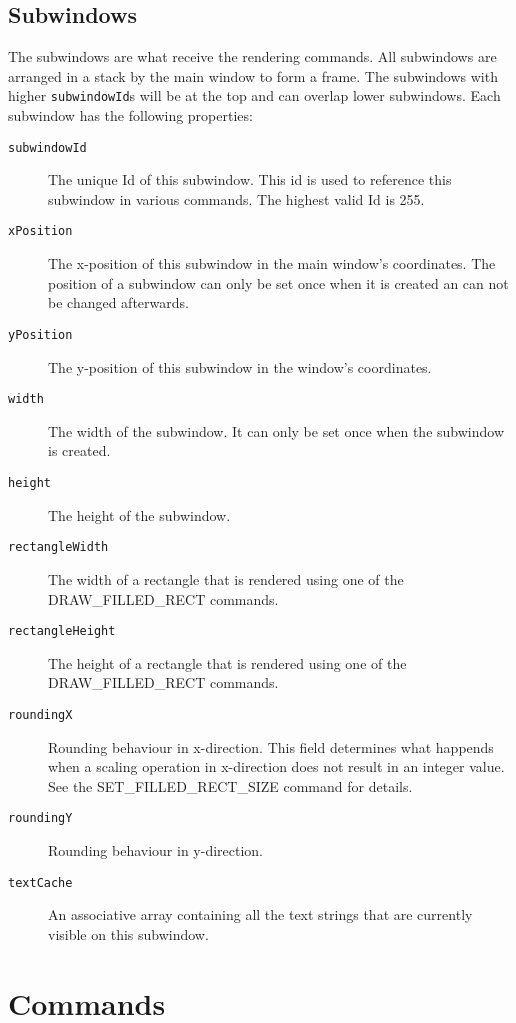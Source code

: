 \documentclass{article}
\newcommand{\field}[1]{\textcolor{fieldColor}{\texttt{#1}}}
\begin{document}
\subsection{Subwindows}
The subwindows are what receive the rendering commands. All subwindows are arranged in a stack by the main window to form a frame. The subwindows with higher \field{subwindowId}s will be at
the top and can overlap lower subwindows.
Each subwindow has the following properties:

\begin{description}
\item [\field{subwindowId}] The unique Id of this subwindow. This id is used to reference this subwindow in various commands. The highest valid Id is 255.
\item [\field{xPosition}] The x-position of this subwindow in the main window's coordinates. The position of a subwindow can only be set once when it is created an can not be changed afterwards.
\item [\field{yPosition}] The y-position of this subwindow in the window's coordinates.
\item [\field{width}] The width of the subwindow. It can only be set once when the subwindow is created.
\item [\field{height}] The height of the subwindow.
\item [\field{rectangleWidth}] The width of a rectangle that is rendered using one of the DRAW\_FILLED\_RECT commands.
\item [\field{rectangleHeight}] The height of a rectangle that is rendered using one of the DRAW\_FILLED\_RECT commands.
\item [\field{roundingX}] Rounding behaviour in x-direction. This field determines what happends when a scaling operation in x-direction does not result in an integer value. See the SET\_FILLED\_RECT\_SIZE
command for details.
\item [\field{roundingY}] Rounding behaviour in y-direction.
\item [\field{textCache}] An associative array containing all the text strings that are currently visible on this subwindow.
\end{description}


\section{Commands}
\end{document}
